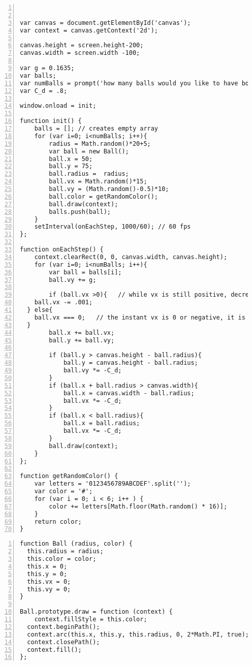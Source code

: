 \begin{lstlisting}[breaklines=true, frame=single, numbers=left, caption=Multiple Balls Bouncing Simulation, label=lst:ballsbouncing]


var canvas = document.getElementById('canvas');
var context = canvas.getContext('2d'); 

canvas.height = screen.height-200;
canvas.width = screen.width -100;

var g = 0.1635;
var balls;
var numBalls = prompt('how many balls would you like to have bounce?'); 
var C_d = .8;
 
window.onload = init; 
 
function init() {
	balls = []; // creates empty array
	for (var i=0; i<numBalls; i++){
		radius = Math.random()*20+5;
		var ball = new Ball();	
		ball.x = 50;
		ball.y = 75;
		ball.radius =  radius;
		ball.vx = Math.random()*15;
		ball.vy = (Math.random()-0.5)*10;
		ball.color = getRandomColor();
		ball.draw(context);
		balls.push(ball);
	}  
	setInterval(onEachStep, 1000/60); // 60 fps
};
 
function onEachStep() {
	context.clearRect(0, 0, canvas.width, canvas.height); 
	for (var i=0; i<numBalls; i++){
		var ball = balls[i];
		ball.vy += g;     

		if (ball.vx >0){   // while vx is still positive, decrease it incrementally to represent air resistance/friction
    ball.vx -= .001;
  } else{
    ball.vx === 0;   // the instant vx is 0 or negative, it is set to 0 to stop the movement in x direction
  }
		ball.x += ball.vx; 
		ball.y += ball.vy; 
			
		if (ball.y > canvas.height - ball.radius){ 
			ball.y = canvas.height - ball.radius; 
			ball.vy *= -C_d; 
		}
		if (ball.x + ball.radius > canvas.width){
			ball.x = canvas.width - ball.radius; 
			ball.vx *= -C_d;
		}
		if (ball.x < ball.radius){
			ball.x = ball.radius;
			ball.vx *= -C_d;
		}
		ball.draw(context); 
	} 
};

function getRandomColor() {
    var letters = '0123456789ABCDEF'.split('');
    var color = '#';
    for (var i = 0; i < 6; i++ ) {
        color += letters[Math.floor(Math.random() * 16)];
    }
    return color;
}

\end{lstlisting}

\vspace{2cm}

\begin{lstlisting}[breaklines=true, frame=single, numbers=left, caption=Ball.js file used for prototype ball object label=lst:ballprototype]
function Ball (radius, color) {
  this.radius = radius;
  this.color = color;
  this.x = 0;
  this.y = 0;
  this.vx = 0;
  this.vy = 0;
}

Ball.prototype.draw = function (context) {
	context.fillStyle = this.color;
  context.beginPath();
  context.arc(this.x, this.y, this.radius, 0, 2*Math.PI, true);
  context.closePath();
  context.fill();  
};
\end{lstlisting}

